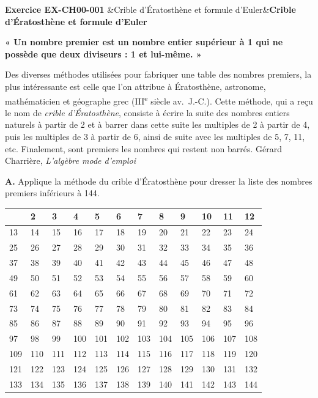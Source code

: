 \documentclass[12pt, a4paper]{article}
\newcommand{\titrexercice}[2]{%
  \begin{mdframed}[
    backgroundcolor=vlmgray,
    linecolor=vlmblue,
    linewidth=1.5pt,
    innerleftmargin=10pt,
    innerrightmargin=10pt,
    innertopmargin=6pt,
    innerbottommargin=6pt,
    skipabove=1em,
    skipbelow=0.5em
  ]
  \textbf{\textcolor{vlmblue}{Exercice #1}}%
  \ifx&#2&\else\hfill\textbf{#2}\fi
  \end{mdframed}
}
\newenvironment{exercice}[2]{%
  \titrexercice{#1}{#2}
  \vspace{0.3em}
}{%
  \vspace{1em}
}
\begin{document}
\begin{exercice}{EX-CH00-001}{Crible d'Ératosthène et formule d'Euler}

\textbf{« Un nombre premier est un nombre entier supérieur à 1 qui ne possède que deux diviseurs : 1 et lui-même. »}

\medskip
Des diverses méthodes utilisées pour fabriquer une table des nombres premiers, la plus intéressante est celle que l'on attribue à Ératosthène, astronome, mathématicien et géographe grec (III\textsuperscript{e} siècle av.\ J.-C.). Cette méthode, qui a reçu le nom de \textit{crible d'Ératosthène}, consiste à écrire la suite des nombres entiers naturels à partir de 2 et à barrer dans cette suite les multiples de 2 à partir de 4, puis les multiples de 3 à partir de 6, ainsi de suite avec les multiples de 5, 7, 11, etc. Finalement, sont premiers les nombres qui restent non barrés. \hfill{\small Gérard Charrière, \textit{L'algèbre mode d'emploi}}

\medskip
\textbf{A.} Applique la méthode du crible d'Ératosthène pour dresser la liste des nombres premiers inférieurs à 144.

\medskip
\begin{tabular}{|l|l|l|l|l|l|l|l|l|l|l|l|}
\hline
    & 2   & 3   & 4   & 5   & 6   & 7   & 8   & 9   & 10  & 11  & 12  \\
\hline
13  & 14  & 15  & 16  & 17  & 18  & 19  & 20  & 21  & 22  & 23  & 24  \\
\hline
25  & 26  & 27  & 28  & 29  & 30  & 31  & 32  & 33  & 34  & 35  & 36  \\
\hline
37  & 38  & 39  & 40  & 41  & 42  & 43  & 44  & 45  & 46  & 47  & 48  \\
\hline
49  & 50  & 51  & 52  & 53  & 54  & 55  & 56  & 57  & 58  & 59  & 60  \\
\hline
61  & 62  & 63  & 64  & 65  & 66  & 67  & 68  & 69  & 70  & 71  & 72  \\
\hline
73  & 74  & 75  & 76  & 77  & 78  & 79  & 80  & 81  & 82  & 83  & 84  \\
\hline
85  & 86  & 87  & 88  & 89  & 90  & 91  & 92  & 93  & 94  & 95  & 96  \\
\hline
97  & 98  & 99  & 100 & 101 & 102 & 103 & 104 & 105 & 106 & 107 & 108 \\
\hline
109 & 110 & 111 & 112 & 113 & 114 & 115 & 116 & 117 & 118 & 119 & 120 \\
\hline
121 & 122 & 123 & 124 & 125 & 126 & 127 & 128 & 129 & 130 & 131 & 132 \\
\hline
133 & 134 & 135 & 136 & 137 & 138 & 139 & 140 & 141 & 142 & 143 & 144 \\
\hline
\end{tabular}


\end{exercice}
\end{document}
